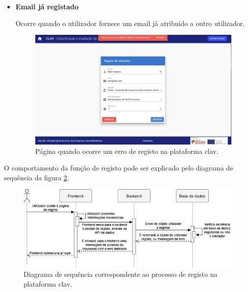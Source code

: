 \begin{itemize}
\begin{itemize}
        \vspace{5cm}
        \item \textbf{Email já registado}
        
        Ocorre quando o utilizador fornece um email já atribuido a outro utilizador.
        
        \begin{figure}[h!]
            \centering
            \includegraphics[width=\textwidth]{img/clav/authlocal/erroRegisto2.png}
            \caption{Página quando ocorre um erro de registo na plataforma \gls{clav}.}
            \label{fig:registoErro2}
        \end{figure}
        
    \end{itemize}
\end{itemize}

O comportamento da função de registo pode ser explicado pelo diagrama de sequência da figura \ref{fig:diagramaRegisto}.

\begin{figure}[h!]
    \centering
    \includegraphics[width=\textwidth]{img/diagramas/sequencia/DiagramasSequencia-Registo.png}
    \caption{Diagrama de sequência correspondente ao processo de registo na plataforma \gls{clav}.}
    \label{fig:diagramaRegisto}
\end{figure}

